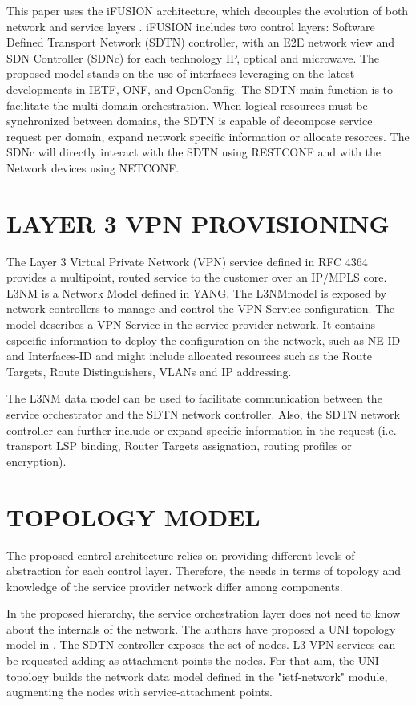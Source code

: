 \documentclass[conference]{IEEEtran}
\begin{document}
This paper uses the iFUSION architecture, which decouples the evolution of both network and service layers \cite{b2}. iFUSION includes two control layers: Software Defined Transport Network (SDTN) controller, with an E2E network view and SDN Controller (SDNc) for each technology IP, optical and microwave. The proposed model stands on the use of interfaces leveraging on the latest developments in IETF, ONF, and OpenConfig.
The SDTN main function is to facilitate the multi-domain orchestration.
When logical resources must be synchronized between domains, the SDTN is capable of decompose service request per domain, expand network specific information or allocate resorces. 
The SDNc will directly interact with the SDTN using RESTCONF and with the Network devices using NETCONF. 

\section{LAYER 3 VPN PROVISIONING}

The Layer 3 Virtual Private Network (VPN) service defined in RFC 4364 provides a multipoint, routed service to the customer over an IP/MPLS core. 
L3NM \cite{b3} is a Network Model defined in YANG. The L3NMmodel is exposed by network controllers to manage and control the VPN Service configuration. The model describes a VPN Service in the service provider network. It contains especific information to deploy the configuration on the network, such as NE-ID and Interfaces-ID and might include allocated resources such as the Route Targets, Route Distinguishers, VLANs and IP addressing.

The L3NM data model can be used to facilitate communication between the service orchestrator and the SDTN network controller. Also, the SDTN network controller can further include or expand specific information in the  request (i.e. transport LSP binding, Router Targets assignation, routing profiles or encryption). 

\section{TOPOLOGY MODEL}

The proposed control architecture relies on providing different levels of abstraction for each control layer. Therefore, the needs in terms of topology and knowledge of the service provider network differ among components.

In the proposed hierarchy, the service orchestration layer does not need to know about the internals of the network. The authors have proposed a UNI topology model in \cite{b4}. The SDTN controller exposes the set of nodes. L3 VPN services can be requested adding as attachment points the nodes. For that aim, the UNI topology builds the network data model defined in the "ietf-network" module, augmenting the nodes with service-attachment points.
\end{document}

